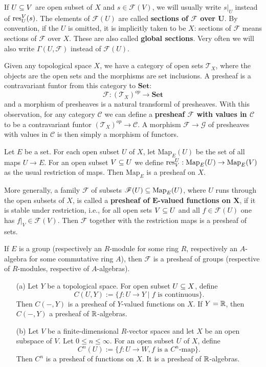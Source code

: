 If $U\subseteq V$ are open subset of $X$ and $s\in\mathscr{F}(V)$, we will usually write $s|_U$ instead of $\mathrm{res}^V_U(s)$. The elements of $\mathscr{F}(U)$ are called \textbf{sections of \boldmath$\mathscr{F}$ over $\bm{U}$}. By convention, if the $U$ is omitted, it is implicitly taken to be $X$: sections of $\mathscr{F}$ means sections of $\mathscr{F}$ over $X$. These are also called \textbf{global sections}. Very often we will also write $\Gamma(U,\mathscr{F})$ instead of $\mathscr{F}(U)$.
\begin{remark}
Given any topological space $X$, we have a category of open sets $\mathcal{T}_X$, where the objects are the open sets and the morphisms are set inclusions. A presheaf is a contravariant funtor from this category to $\mathbf{Set}$:
\[\mathscr{F}:(\mathcal{T}_X)^{op}\to\mathbf{Set}\] 
and a morphism of presheaves is a natural transforml of presheaves. With this observation, for any category $\mathcal{C}$ we can define a \textbf{presheaf $\mathscr{F}$ with values in $\mathcal{C}$} to be a contravariant funtor $(\mathcal{T}_X)^{op}\to\mathcal{C}$. A morphism $\mathscr{F}\to\mathscr{G}$ of presheaves with values in $\mathcal{C}$ is then simply a morphism of functors.
\end{remark}
\begin{example}
Let $E$ be a set. For each open subset $U$ of $X$, let $\mathrm{Map}_E(U)$ be the set of all maps $U\to E$. For an open subset $V\subseteq U$ we define $\mathrm{res}^U_V:\mathrm{Map}_E(U)\to\mathrm{Map}_E(V)$ as the usual restriction of maps. Then $ \mathrm{Map}_E$ is a presheaf on $X$.\par
More generally, a family $\mathscr{F}$ of subsets $\mathscr{F}(U)\subseteq\mathrm{Map}_E(U)$, where $U$ runs through the open subsets of $X$, is called a \textbf{presheaf of $\bm{E}$-valued functions on $\bm{X}$}, if it is stable under restriction, i.e., for all open sets $V\subseteq U$ and all $f\in\mathscr{F}(U)$ one has $f|_V\in\mathscr{F}(V)$. Then $\mathscr{F}$ together with the restriction maps is a presheaf of sets.\par 
If $E$ is a group (respectively an $R$-module for some ring $R$, respectively an $A$-algebra for some commutative ring $A$), then $\mathscr{F}$ is a presheaf of groups (respective of $R$-modules, respective of $A$-algebras).
\end{example}
\begin{example}
\mbox{}
\begin{itemize}
\item[(a)] Let $Y$ be a topological space. For open subset $U\subseteq X$, define
\[C(U,Y):=\{f:U\to Y\mid\text{$f$ is continuous}\}.\]
Then $C(-,Y)$ is a presheaf of $Y$-valued functions on $X$. If $Y=\mathbb{R}$, then $C(-,Y)$ a presheaf of $\mathbb{R}$-algebras.
\item[(b)] Let $V$ be a finite-dimensional $R$-vector spaces and let $X$ be an open subspace of $V$. Let $0\leq n\leq\infty$. For an open subset $U$ of $X$, define
\[C^n(U):=\{f:U\to W, \text{$f$ is a $C^n$-map}\}.\]
Then $C^n$ is a presheaf of functions on $X$. It is a presheaf of $\mathbb{R}$-algebras.
\end{itemize}
\end{example}
